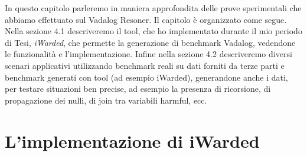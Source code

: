 In questo capitolo parleremo in maniera approfondita delle prove sperimentali che abbiamo effettuato sul Vadalog Resoner. \newline
Il capitolo è organizzato come segue. Nella sezione 4.1 descriveremo il tool, che ho implementato durante il mio periodo di Tesi, \emph{iWarded}, che permette la generazione di benchmark Vadalog, vedendone le funzionalità e l'implementazione. \newline
Infine nella sezione 4.2 descriveremo diversi scenari applicativi utilizzando benchmark reali su dati forniti da terze parti e benchmark generati con tool (ad esempio iWarded), generandone anche i dati, per testare situazioni ben precise, ad esempio la presenza di ricorsione, di propagazione dei nulli, di join tra variabili harmful, ecc.

\section{L'implementazione di iWarded}

